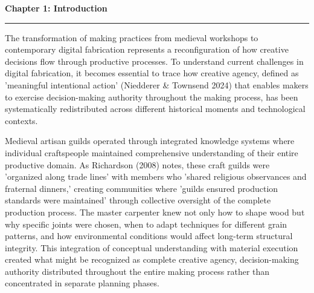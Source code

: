 \setcounter{chapter}{1}
\setcounter{section}{0}

\noindent
{\Large\textbf{Chapter 1: Introduction}}
\vspace{0.3cm}
\hrule
\vspace{0.8cm}
\label{ch:introduction}

\setlength{\parindent}{0pt}

The transformation of making practices from medieval workshops to contemporary digital fabrication represents a reconfiguration of how creative decisions flow through productive processes. To understand current challenges in digital fabrication, it becomes essential to trace how creative agency, defined as 'meaningful intentional action' (Niedderer \& Townsend 2024) that enables makers to exercise decision-making authority throughout the making process, has been systematically redistributed across different historical moments and technological contexts.

\vspace{0.5cm}

Medieval artisan guilds operated through integrated knowledge systems where individual craftspeople maintained comprehensive understanding of their entire productive domain. As Richardson (2008) notes, these craft guilds were 'organized along trade lines' with members who 'shared religious observances and fraternal dinners,' creating communities where 'guilds ensured production standards were maintained' through collective oversight of the complete production process. The master carpenter knew not only how to shape wood but why specific joints were chosen, when to adapt techniques for different grain patterns, and how environmental conditions would affect long-term structural integrity. This integration of conceptual understanding with material execution created what might be recognized as complete creative agency, decision-making authority distributed throughout the entire making process rather than concentrated in separate planning phases.

\vspace{0.5cm}

